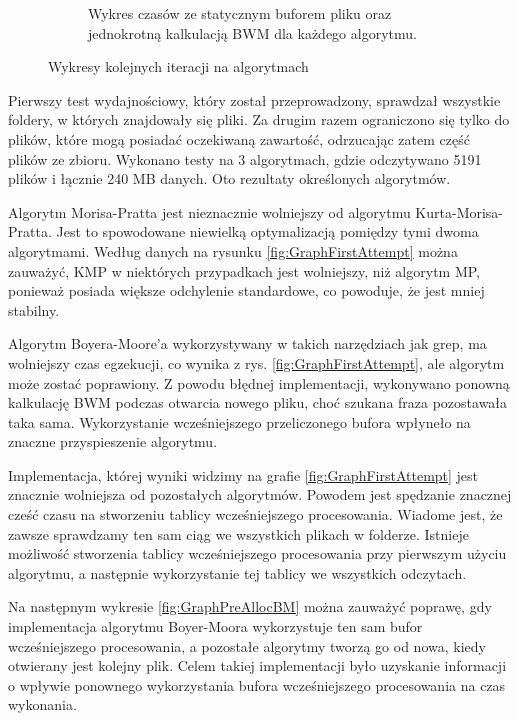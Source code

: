 \begin{figure}
\begin{subfigure}{0.7\textwidth}
    \caption{Wykres czasów ze statycznym buforem pliku oraz jednokrotną kalkulacją BWM dla każdego algorytmu.}
    \label{fig:GraphStaticPreallocAndFileBuffer}
\end{subfigure}
\caption{Wykresy kolejnych iteracji na algorytmach}
\label{fig:GraphsIterationComparison}
\end{figure}

Pierwszy test wydajnościowy, który został przeprowadzony, sprawdzał wszystkie 
foldery, w których znajdowały się pliki. Za drugim razem ograniczono się tylko
do plików, które mogą posiadać oczekiwaną zawartość, odrzucając zatem część 
plików ze zbioru. Wykonano testy na 3 algorytmach, gdzie odczytywano 5191 plików 
i łącznie 240 MB danych. Oto rezultaty określonych algorytmów.

Algorytm Morisa-Pratta jest nieznacznie wolniejszy od algorytmu 
Kurta-Morisa-Pratta. Jest to spowodowane niewielką optymalizacją pomiędzy tymi 
dwoma algorytmami. Według danych na rysunku \ref{fig:GraphFirstAttempt} można 
zauważyć, KMP w niektórych przypadkach jest wolniejszy, niż algorytm MP, 
ponieważ posiada większe odchylenie standardowe, co powoduje, że jest mniej
stabilny. 


Algorytm Boyera-Moore'a wykorzystywany w takich narzędziach jak grep, ma 
wolniejszy czas egzekucji, co wynika z rys. \ref{fig:GraphFirstAttempt}, ale 
algorytm może zostać poprawiony. Z powodu błędnej implementacji, wykonywano
ponowną kalkulację BWM podczas otwarcia nowego pliku, choć szukana fraza pozostawała
taka sama. Wykorzystanie wcześniejszego przeliczonego bufora wpłyneło na znaczne
przyspieszenie algorytmu.

Implementacja, której wyniki widzimy na grafie \ref{fig:GraphFirstAttempt} jest
znacznie wolniejsza od pozostałych algorytmów. Powodem jest spędzanie znacznej
cześć czasu na stworzeniu tablicy wcześniejszego procesowania. Wiadome jest, że zawsze 
sprawdzamy ten sam ciąg we wszystkich plikach w folderze. Istnieje możliwość 
stworzenia tablicy wcześniejszego procesowania przy pierwszym użyciu algorytmu, a następnie
wykorzystanie tej tablicy we wszystkich odczytach.

Na następnym wykresie \ref{fig:GraphPreAllocBM} można zauważyć poprawę, gdy
implementacja algorytmu Boyer-Moora wykorzystuje ten sam bufor wcześniejszego procesowania, a
pozostałe algorytmy tworzą go od nowa, kiedy otwierany jest kolejny plik. Celem 
takiej implementacji było uzyskanie informacji o wpływie ponownego wykorzystania
bufora wcześniejszego procesowania na czas wykonania. 

